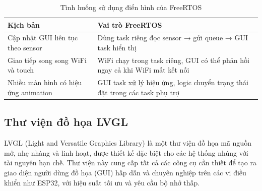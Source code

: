 \begin{table}[H]
  \centering
  \begin{tabular}{|l|p{10cm}|}
  \hline
  \textbf{Kịch bản} & \textbf{Vai trò FreeRTOS} \\
  \hline
  Cập nhật GUI liên tục theo sensor & Dùng task riêng đọc sensor → gửi queue → GUI task hiển thị \\
  Giao tiếp song song WiFi và touch & WiFi chạy trong task riêng, GUI có thể phản hồi ngay cả khi WiFi mất kết nối \\
  Nhiều màn hình có hiệu ứng animation & GUI task xử lý hiệu ứng, logic chuyển trạng thái đặt trong các task phụ trợ \\
  \hline
  \end{tabular}
  \caption{Tình huống sử dụng điển hình của FreeRTOS}
\end{table}

\subsection{Thư viện đồ họa LVGL}
\tab LVGL (Light and Versatile Graphics Library) là một thư viện đồ họa mã nguồn mở, nhẹ nhàng và linh hoạt, được thiết kế đặc biệt cho các hệ thống nhúng với tài nguyên hạn chế. Thư viện này cung cấp tất cả các công cụ cần thiết để tạo ra giao diện người dùng đồ họa (GUI) hấp dẫn và chuyên nghiệp trên các vi điều khiển như ESP32, với hiệu suất tối ưu và yêu cầu bộ nhớ thấp.
